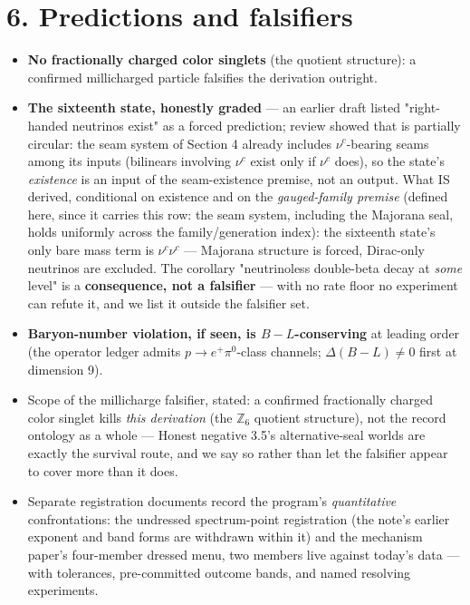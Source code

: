 \documentclass[11pt]{article}
\begin{document}
\section*{6. Predictions and falsifiers}
\begin{itemize}
\item \textbf{No fractionally charged color singlets} (the quotient structure): a confirmed millicharged particle falsifies the derivation outright.
\item \textbf{The sixteenth state, honestly graded} — an earlier draft listed "right-handed neutrinos exist" as a forced prediction; review showed that is partially circular: the seam system of Section 4 already includes $\nu^c$-bearing seams among its inputs (bilinears involving $\nu^c$ exist only if $\nu^c$ does), so the state's \emph{existence} is an input of the seam-existence premise, not an output.  What IS derived, conditional on existence and on the \emph{gauged-family premise} (defined here, since it carries this row: the seam system, including the Majorana seal, holds uniformly across the family/generation index): the sixteenth state's only bare mass term is $\nu^c\nu^c$ — Majorana structure is forced, Dirac-only neutrinos are excluded.  The corollary "neutrinoless double-beta decay at \emph{some} level" is a \textbf{consequence, not a falsifier} — with no rate floor no experiment can refute it, and we list it outside the falsifier set.
\item \textbf{Baryon-number violation, if seen, is $B{-}L$-conserving} at leading order (the operator ledger admits $p \to e^+\pi^0$-class channels; $\Delta(B{-}L) \neq 0$ first at dimension 9).
\item Scope of the millicharge falsifier, stated: a confirmed fractionally charged color singlet kills \emph{this derivation} (the $\mathbb Z_6$ quotient structure), not the record ontology as a whole — Honest negative 3.5's alternative-seal worlds are exactly the survival route, and we say so rather than let the falsifier appear to cover more than it does.
\item Separate registration documents record the program's \emph{quantitative} confrontations: the undressed spectrum-point registration (the note's earlier exponent and band forms are withdrawn within it) and the mechanism paper's four-member dressed menu, two members live against today's data — with tolerances, pre-committed outcome bands, and named resolving experiments.
\end{itemize}
\end{document}
